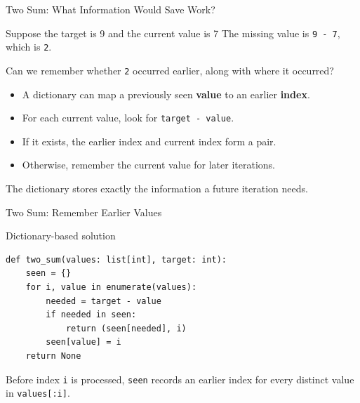 \documentclass[aspectratio=169,10pt]{beamer}
\begin{document}
\begin{frame}{Two Sum: What Information Would Save Work?}
\small
\begin{block}{Suppose the target is 9 and the current value is 7}
The missing value is \texttt{9 - 7}, which is \texttt{2}.
\end{block}
\begin{activity}Can we remember whether \texttt{2} occurred earlier, along with where it occurred?\end{activity}
\begin{itemize}
 \item A dictionary can map a previously seen \textbf{value} to an earlier \textbf{index}.
 \item For each current value, look for \texttt{target - value}.
 \item If it exists, the earlier index and current index form a pair.
 \item Otherwise, remember the current value for later iterations.
\end{itemize}
\begin{keyidea}The dictionary stores exactly the information a future iteration needs.\end{keyidea}
\end{frame}

\begin{frame}[fragile]{Two Sum: Remember Earlier Values}
\small
\begin{block}{Dictionary-based solution}
\footnotesize
\begin{verbatim}
def two_sum(values: list[int], target: int):
    seen = {}
    for i, value in enumerate(values):
        needed = target - value
        if needed in seen:
            return (seen[needed], i)
        seen[value] = i
    return None
\end{verbatim}
\end{block}
\begin{keyidea}Before index \texttt{i} is processed, \texttt{seen} records an earlier index for every distinct value in \texttt{values[:i]}.\end{keyidea}
\end{frame}
\end{document}
